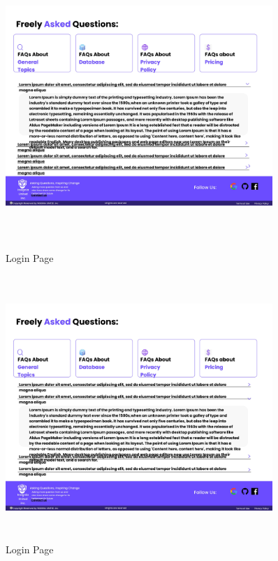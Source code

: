 \begin{figure}[H]
\includegraphics[height=10cm, width=0.9\textwidth]{./images/prototype/0018}
\centering 
\caption{Login Page}
\label{fig:prototype1}

\includegraphics[height=10cm, width=0.9\textwidth]{./images/prototype/0019}
\centering 
\caption{Login Page}
\label{fig:prototype1}
\end{figure}

